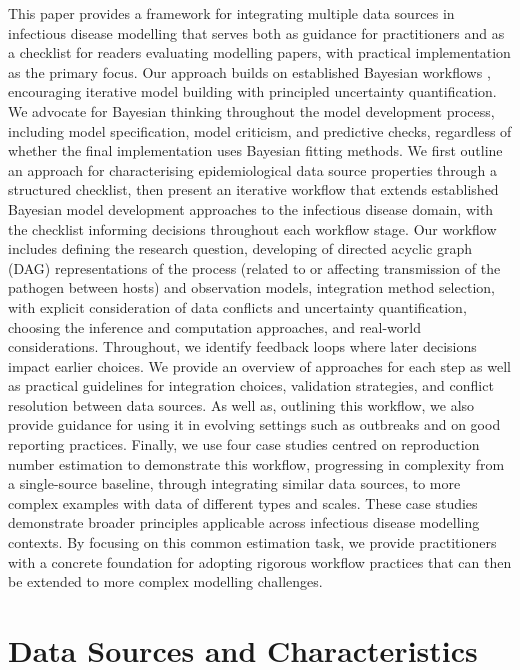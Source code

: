 \documentclass{article}
\begin{document}
This paper provides a framework for integrating multiple data sources in infectious disease modelling that serves both as guidance for practitioners and as a checklist for readers evaluating modelling papers, with practical implementation as the primary focus. 
Our approach builds on established Bayesian workflows \citep{gelman2020bayesian}, encouraging iterative model building with principled uncertainty quantification. We advocate for Bayesian thinking throughout the model development process, including model specification, model criticism, and predictive checks, regardless of whether the final implementation uses Bayesian fitting methods. 
We first outline an approach for characterising epidemiological data source properties through a structured checklist, then present an iterative workflow that extends established Bayesian model development approaches to the infectious disease domain, with the checklist informing decisions throughout each workflow stage. 
Our workflow includes defining the research question, developing of directed acyclic graph (DAG) representations of the process (related to or affecting transmission of the pathogen between hosts) and observation models, integration method selection, with explicit consideration of data conflicts and uncertainty quantification, choosing the inference and computation approaches, and real-world considerations. Throughout, we identify feedback loops where later decisions impact earlier choices. 
We provide an overview of approaches for each step as well as practical guidelines for integration choices, validation strategies, and conflict resolution between data sources. 
As well as, outlining this workflow, we also provide guidance for using it in evolving settings such as outbreaks and on good reporting practices.
Finally, we use four case studies centred on reproduction number estimation to demonstrate this workflow, progressing in complexity from a single-source baseline, through integrating similar data sources, to more complex examples with data of different types and scales. 
These case studies demonstrate broader principles applicable across infectious disease modelling contexts. 
By focusing on this common estimation task, we provide practitioners with a concrete foundation for adopting rigorous workflow practices that can then be extended to more complex modelling challenges.

\section{Data Sources and Characteristics} \label{sec:datareview}
\end{document}
